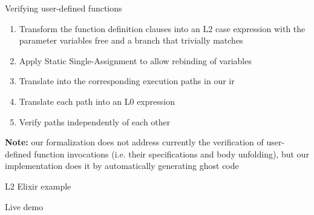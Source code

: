 \documentclass{beamer}
\begin{document}
  \begin{frame}{Verifying user-defined functions}
    \begin{enumerate}
      \item \pause Transform the function definition clauses into an L2 case 
        expression with the parameter variables free and a branch that trivially matches
      \item \pause Apply Static Single-Assignment to allow rebinding of variables
      \item \pause Translate into the corresponding execution paths in our \gls*{ir}
      \item \pause Translate each path into an L0 expression
      \item \pause Verify paths independently of each other
    \end{enumerate}

    \pause \textbf{Note:} our formalization does not address currently the verification 
    of user-defined function invocations (i.e. their specifications and body unfolding),
    but our implementation does it by automatically generating ghost code
  \end{frame}


  \begin{frame}[plain,c]{L2 Elixir example}
    \begin{center}
      \Huge Live demo
    \end{center}
  \end{frame}
\end{document}
